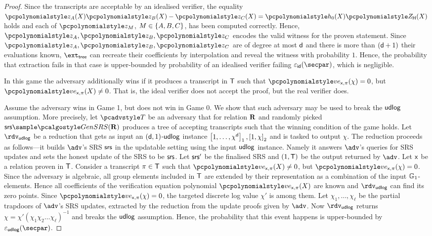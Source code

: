 \begin{proof}
	Since the transcripts are acceptable by an idealised verifier, the equality
	$\p{z_A} (X) \p{z_B} (X) - \p{z_C} (X) = \p{h_0} (X) \ZERO_\HHH (X)$ holds and
	each of $\p{z}_M$, $M \in \{A, B, C\}$, has been computed
	correctly. Hence, $\p{z_A}, \p{z_B}, \p{z_C}$ encodes the valid witness for
	the proven statement. Since $\p{z_A}, \p{z_B}, \p{z_C}$ are of degree at most
	$\mathsf{d}$ and there is more than $(\mathsf{d} + 1)$ their evaluations
	known, $\extt$ can recreate their coefficients by interpolation and reveal the
	witness with probability $1$. Hence, the probability that extraction fails in
	that case is upper-bounded by probability of an idealised verifier failing
	$\epsid(\secpar)$, which is negligible.
	
	 In this game the adversary additionally wins if it produces a
	transcript in $\mathsf{T}$ such that $\vereq_{\inp, \zkproof}(\chi) = 0$, but
	$\vereq_{\inp, \zkproof}(X) \neq 0$. That is, the ideal verifier does not
	accept the proof, but the real verifier does.
	
	 Assume the adversary wins in Game 1, but
	does not win in Game 0. We show that such adversary may be used to break the
	$\mathsf{udlog}$ assumption. More precisely, let $\tdv$ be an adversary that for
	relation $\mathbf{R}$ and randomly picked $\srs \sample \kgen(\REL)$ produces a tree
	of accepting transcripts such that the winning condition of the game
	holds. Let $\rdvdulog$ be a reduction that gets as input an
	$(\mathsf{d}, 1)$-$\mathsf{udlog}$ instance $\left[1, \ldots, \chi^{\mathsf{d}}\right]_{1}, \left[1, \chi\right]_{2}$ and
	is tasked to output $\chi$. The reduction proceeds as follows---it builds $\adv$'s SRS $\mathsf{srs}$ in the updatable setting using the input $\mathsf{udlog}$ instance. Namely it answers $\adv$'s queries for SRS updates and sets the honest update of the SRS to be $\mathsf{srs}$. Let $\mathsf{srs}'$ be the finalised SRS and $(1, \mathsf{T})$ be the output
	returned by $\adv$. Let $\mathsf{x}$ be a relation proven in $\mathsf{T}$.  Consider a
	transcript $\pi \in \mathsf{T}$ such that $\vereq_{\inp, \zkproof}(X) \neq 0$,
	but $\vereq_{\inp, \zkproof}(\chi) = 0$. Since the adversary is algebraic, all
	group elements included in $\mathsf{T}$ are extended by their representation as a
	combination of the input $\mathbb{G}_1$-elements. Hence all coefficients of the
	verification equation polynomial $\vereq_{\inp, \zkproof}(X)$ are known and
	$\rdvudlog$ can find its zero points. Since
	$\vereq_{\inp, \zkproof}(\chi) = 0$, the targeted discrete log value $\chi'$ is
	among them.  Let $\chi_1, \ldots, \chi_\ell$ be the partial trapdoors of $\adv$'s SRS updates,  extracted by the reduction from the update proofs given by $\adv$. Now $\rdvudlog$ returns $\chi = \chi' (\chi_1 \chi_2 \ldots \chi_\ell)^{-1}$ and breaks the $\mathsf{udlog}$ assumption. Hence, the probability that this event happens is upper-bounded
	by $\epsudlog(\secpar)$.
	
\end{proof}

